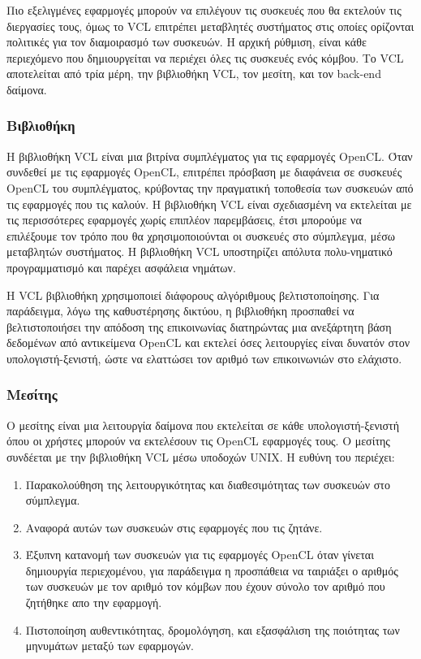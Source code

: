 Πιο εξελιγμένες εφαρμογές μπορούν να επιλέγουν τις συσκευές που θα εκτελούν τις διεργασίες τους, όμως το VCL επιτρέπει μεταβλητές συστήματος στις οποίες ορίζονται πολιτικές για τον διαμοιρασμό των συσκευών. Η αρχική ρύθμιση, είναι κάθε περιεχόμενο που δημιουργείται να περιέχει όλες τις συσκευές ενός κόμβου. Το VCL αποτελείται από τρία μέρη, την βιβλιοθήκη VCL, τον μεσίτη, και τον back-end δαίμονα. 
\subsubsection{Βιβλιοθήκη}
Η βιβλιοθήκη VCL είναι μια βιτρίνα συμπλέγματος για τις εφαρμογές OpenCL. Όταν συνδεθεί με τις εφαρμογές OpenCL, επιτρέπει πρόσβαση με διαφάνεια σε συσκευές OpenCL του συμπλέγματος, κρύβοντας την πραγματική τοποθεσία των συσκευών από τις εφαρμογές που τις καλούν. Η βιβλιοθήκη VCL είναι σχεδιασμένη να εκτελείται με τις περισσότερες εφαρμογές χωρίς επιπλέον παρεμβάσεις, έτσι μπορούμε να επιλέξουμε τον τρόπο που θα χρησιμοποιούνται οι συσκευές στο σύμπλεγμα, μέσω μεταβλητών συστήματος. Η βιβλιοθήκη VCL υποστηρίζει απόλυτα πολυ-νηματικό προγραμματισμό και παρέχει ασφάλεια νημάτων.

Η VCL βιβλιοθήκη χρησιμοποιεί διάφορους αλγόριθμους βελτιστοποίησης. Για παράδειγμα, λόγω της καθυστέρησης δικτύου, η βιβλιοθήκη προσπαθεί να βελτιστοποιήσει την απόδοση της επικοινωνίας διατηρώντας μια ανεξάρτητη βάση δεδομένων από αντικείμενα OpenCL και εκτελεί όσες λειτουργίες είναι δυνατόν στον υπολογιστή-ξενιστή, ώστε να ελαττώσει τον αριθμό των επικοινωνιών στο ελάχιστο.
\subsubsection{Μεσίτης}
Ο μεσίτης είναι μια λειτουργία δαίμονα που εκτελείται σε κάθε υπολογιστή-ξενιστή όπου οι χρήστες μπορούν να εκτελέσουν τις OpenCL εφαρμογές τους. Ο μεσίτης συνδέεται με την βιβλιοθήκη VCL μέσω υποδοχών UNIX. Η ευθύνη του περιέχει:
\begin{enumerate}
\item Παρακολούθηση της λειτουργικότητας και διαθεσιμότητας των συσκευών στο σύμπλεγμα.
\item Αναφορά αυτών των συσκευών στις εφαρμογές που τις ζητάνε.
\item Έξυπνη κατανομή των συσκευών για τις εφαρμογές OpenCL όταν γίνεται δημιουργία περιεχομένου, για παράδειγμα η προσπάθεια να ταιριάξει ο αριθμός των συσκευών με τον αριθμό τον κόμβων που έχουν σύνολο τον αριθμό που ζητήθηκε απο την εφαρμογή.
\item Πιστοποίηση αυθεντικότητας, δρομολόγηση, και εξασφάλιση της ποιότητας των μηνυμάτων μεταξύ των εφαρμογών. 
\end{enumerate}
